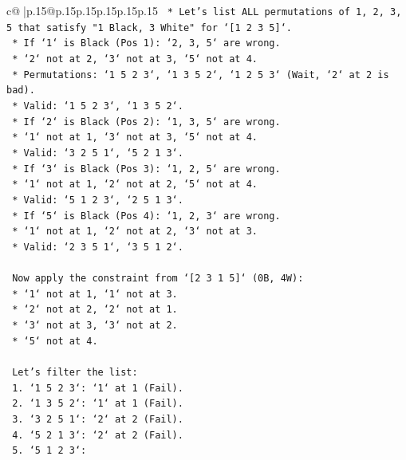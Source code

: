 \documentclass{article}
\begin{document}
{\begin{supertabular}{c@{$\;$}|p{.15\linewidth}@{}p{.15\linewidth}p{.15\linewidth}p{.15\linewidth}p{.15\linewidth}p{.15\linewidth}}
{{{\texttt{    *   Let's list ALL permutations of 1, 2, 3, 5 that satisfy "1 Black, 3 White" for `{[}1 2 3 5{]}`.} \\
\texttt{        *   If `1` is Black (Pos 1): `2, 3, 5` are wrong.} \\
\texttt{            *   `2` not at 2, `3` not at 3, `5` not at 4.} \\
\texttt{            *   Permutations: `1 5 2 3`, `1 3 5 2`, `1 2 5 3` (Wait, `2` at 2 is bad).} \\
\texttt{            *   Valid: `1 5 2 3`, `1 3 5 2`.} \\
\texttt{        *   If `2` is Black (Pos 2): `1, 3, 5` are wrong.} \\
\texttt{            *   `1` not at 1, `3` not at 3, `5` not at 4.} \\
\texttt{            *   Valid: `3 2 5 1`, `5 2 1 3`.} \\
\texttt{        *   If `3` is Black (Pos 3): `1, 2, 5` are wrong.} \\
\texttt{            *   `1` not at 1, `2` not at 2, `5` not at 4.} \\
\texttt{            *   Valid: `5 1 2 3`, `2 5 1 3`.} \\
\texttt{        *   If `5` is Black (Pos 4): `1, 2, 3` are wrong.} \\
\texttt{            *   `1` not at 1, `2` not at 2, `3` not at 3.} \\
\texttt{            *   Valid: `2 3 5 1`, `3 5 1 2`.} \\
\\ 
\texttt{    Now apply the constraint from `{[}2 3 1 5{]}` (0B, 4W):} \\
\texttt{    *   `1` not at 1, `1` not at 3.} \\
\texttt{    *   `2` not at 2, `2` not at 1.} \\
\texttt{    *   `3` not at 3, `3` not at 2.} \\
\texttt{    *   `5` not at 4.} \\
\\ 
\texttt{    Let's filter the list:} \\
\texttt{    1.  `1 5 2 3`: `1` at 1 (Fail).} \\
\texttt{    2.  `1 3 5 2`: `1` at 1 (Fail).} \\
\texttt{    3.  `3 2 5 1`: `2` at 2 (Fail).} \\
\texttt{    4.  `5 2 1 3`: `2` at 2 (Fail).} \\
\texttt{    5.  `5 1 2 3`:} \\
}}}
\end{supertabular}}
\end{document}
